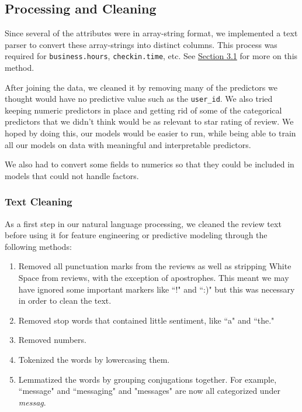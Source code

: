 \documentclass[10pt]{article}
\begin{document}
\subsection{Processing and Cleaning}
Since several of the attributes were in array-string format, we implemented a text parser to convert these array-strings into distinct columns. This process was required for \texttt{business.hours}, \texttt{checkin.time}, etc. See \hyperref[nfe]{\color{blue}Section 3.1\color{black}} for more on this method.
\vspace{0.1in}

\noindent
After joining the data, we cleaned it by removing many of the predictors we thought would have no predictive value such as the \texttt{user\_id}. We also tried keeping numeric predictors in place and getting rid of some of the categorical predictors that we didn't think would be as relevant to star rating of review. We hoped by doing this, our models would be easier to run, while being able to train all our models on data with meaningful and interpretable predictors. 
\vspace{0.1in}

\noindent
We also had to convert some fields to numerics so that they could be included in models that could not handle factors.

\subsubsection{Text Cleaning}
As a first step in our natural language processing, we cleaned the review text before using it for feature engineering or predictive modeling through the following methods:
\begin{enumerate}[(1)]
    \item Removed all punctuation marks from the reviews as well as stripping White Space from reviews, with the exception of apostrophes. This meant we may have ignored some important markers like ``!" and ``:)" but this was necessary in order to clean the text.
    \item Removed stop words that contained little sentiment, like ``a" and ``the."
    \item Removed numbers.
    \item Tokenized the words by lowercasing them.
    \item Lemmatized the words by grouping conjugations together. For example, ``message" and ``messaging" and "messages" are now all categorized under \textit{messag}.
\end{enumerate}
\end{document}
